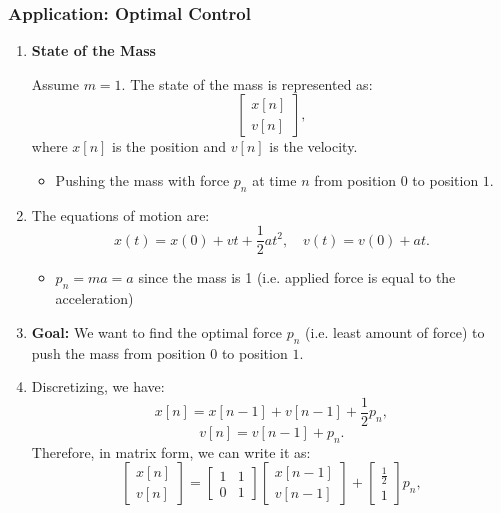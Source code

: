\subsubsection{Application: Optimal Control}
\begin{example}
    \begin{enumerate}
        \item \textbf{State of the Mass}

        Assume \( m = 1 \). The state of the mass is represented as:
        \[
        \begin{bmatrix}
        x[n] \\ 
        v[n]
        \end{bmatrix},
        \]
        where \(x[n]\) is the position and \(v[n]\) is the velocity.

        \begin{itemize}
            \item Pushing the mass with force \(p_n\) at time \(n\) from position $0$ to position $1$.
        \end{itemize}
        
        \item The equations of motion are:
        \[
        x(t) = x(0) + vt + \frac{1}{2} a t^2, \quad v(t) = v(0) + at.
        \]
        \begin{itemize}
            \item $p_n = ma = a$ since the mass is 1 (i.e. applied force is equal to the acceleration)
        \end{itemize}

        \item \textbf{Goal:} We want to find the optimal force \(p_n\) (i.e. least amount of force) to push the mass from position \(0\) to position \(1\).
        
        \item Discretizing, we have:
        \[
        x[n] = x[n-1] + v[n-1] + \frac{1}{2} p_n,
        \]
        \[
        v[n] = v[n-1] + p_n.
        \]
        Therefore, in matrix form, we can write it as:
        \[
        \begin{bmatrix}
        x[n] \\ 
        v[n]
        \end{bmatrix}
        =
        \begin{bmatrix}
        1 & 1 \\ 
        0 & 1
        \end{bmatrix}
        \begin{bmatrix}
        x[n-1] \\ 
        v[n-1]
        \end{bmatrix}
        +
        \begin{bmatrix}
        \frac{1}{2} \\ 
        1
        \end{bmatrix} p_n,
        \]
        

\end{enumerate}
\end{example}
